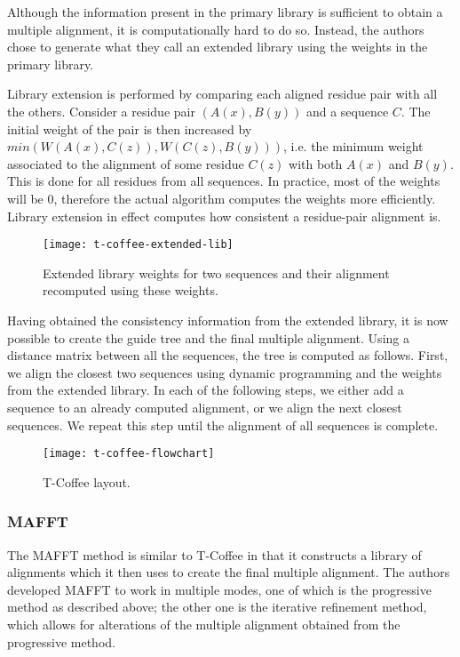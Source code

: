 Although the information present in the primary library is sufficient to obtain a multiple alignment, it is computationally hard to do so. Instead,
the authors chose to generate what they call an extended library using the weights in the primary library.

Library extension is performed by comparing each aligned residue pair with all the others. Consider a residue pair $(A(x), B(y))$ and a sequence $C$.
The initial weight of the pair is then increased by $min(W(A(x), C(z)), W(C(z), B(y)))$, i.e. the minimum weight associated to the alignment of some
residue $C(z)$ with both $A(x)$ and $B(y)$. This is done for all residues from all sequences. In practice, most of the weights will be 0, therefore 
the actual algorithm computes the weights more efficiently. Library extension in effect computes how consistent a residue-pair alignment is.

\begin{figure}[h]
\centering
\texttt{[image: t-coffee-extended-lib]}
\caption{Extended library weights for two sequences and their alignment recomputed using these weights. \citep[Figure~2(c)]{t_coffee}}
\end{figure}

Having obtained the consistency information from the extended library, it is now possible to create the guide tree and the final multiple alignment.
Using a distance matrix between all the sequences, the tree is computed as follows. First, we align the closest two sequences using dynamic programming
and the weights from the extended library. In each of the following steps, we either add a sequence to an already computed alignment, or we align
the next closest sequences. We repeat this step until the alignment of all sequences is complete.

\begin{figure}[h]
\centering
\texttt{[image: t-coffee-flowchart]}
\caption{T-Coffee layout. \citep[Figure~1]{t_coffee}}
\end{figure}

\subsubsection{MAFFT}

The MAFFT method is similar to T-Coffee in that it constructs a library of alignments which it then uses to create the final multiple alignment. The authors developed MAFFT
to work in multiple modes, one of which is the progressive method as described above; the other one is the iterative refinement method, which allows for alterations
of the multiple alignment obtained from the progressive method.

